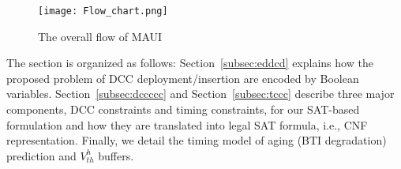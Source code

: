 
\begin{comment}
The basic idea of our MAUI framework for aging tolerance is to insert \textit{duty-cycle converters} (DCCs) in the existing clock tree, so as to intentionally create aging-induced clock skews which can compensate for the performance degradation of the logic circuit based on time borrowing. We formulate the problem using Boolean satisfiability (SAT) and thanks to the efficiency of existing SAT solvers, the optimal solution can be obtained efficiently. The end result of this formulation is the locations (in the existing clock tree) to insert DCCs such that, when aging-induced clock skews are considered, the required clock period of the given circuit under $n$-year BTI is minimized. Note that the clock period can be minimized since the performance degradation of the logic circuit is \enquote{tolerated} as a result of useful aging-induced clock skews. The minimum required clock period thus implies maximum level of aging tolerance.
\end{comment}

\begin{figure}
	\centering
	\texttt{[image: Flow\_chart.png]}
	\caption{The overall flow of MAUI}
	\label{fig:flow}
\end{figure}
 

The section is organized as follows: Section~\ref{subsec:eddcd} explains how the proposed problem of DCC deployment/insertion are encoded by Boolean variables. Section~\ref{subsec:dccccc} and Section~\ref{subsec:tccc} describe three major components, DCC constraints and timing constraints, for our SAT-based formulation and how they are translated into legal SAT formula, i.e., CNF representation. Finally, we detail the timing model of aging (BTI degradation) prediction and $V_{th}^h$ buffers.

